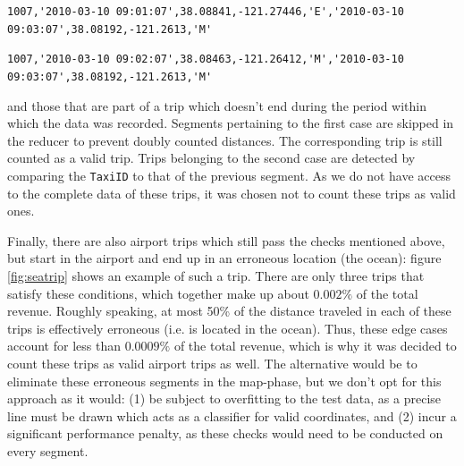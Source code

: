\documentclass[11pt]{article}
\begin{document}
\hspace{-1.5cm}\verb|1007,'2010-03-10 09:01:07',38.08841,-121.27446,'E','2010-03-10 09:03:07',38.08192,-121.2613,'M'|

\hspace{-1.5cm}\verb|1007,'2010-03-10 09:02:07',38.08463,-121.26412,'M','2010-03-10 09:03:07',38.08192,-121.2613,'M'|

and those that are part of a trip which doesn't end during the period within which the data was recorded. Segments pertaining to the first case are skipped in the reducer to prevent doubly counted distances. The corresponding trip is still counted as a valid trip. Trips belonging to the second case are detected by comparing the \texttt{TaxiID} to that of the previous segment. As we do not have access to the complete data of these trips, it was chosen not to count these trips as valid ones.

Finally, there are also airport trips which still pass the checks mentioned above, but start in the airport and end up in an erroneous location (the ocean): figure \ref{fig:seatrip} shows an example of such a trip. There are only three trips that satisfy these conditions, which together
make up about $0.002\%$ of the total revenue. Roughly speaking, at most 50\% of the distance traveled in each of these trips is effectively erroneous (i.e. is located in the ocean). Thus, these edge cases account for less than $0.0009\%$ of the total revenue, which is why it was decided to count these trips as valid airport trips as well. The alternative would be to eliminate these erroneous segments in the map-phase, but we don't opt for this approach as it would:
(1) be subject to overfitting to the test data, as a precise line must be drawn which acts as a classifier for valid coordinates, and
(2) incur a significant performance penalty, as these checks would need to be conducted on every segment.
\end{document}
